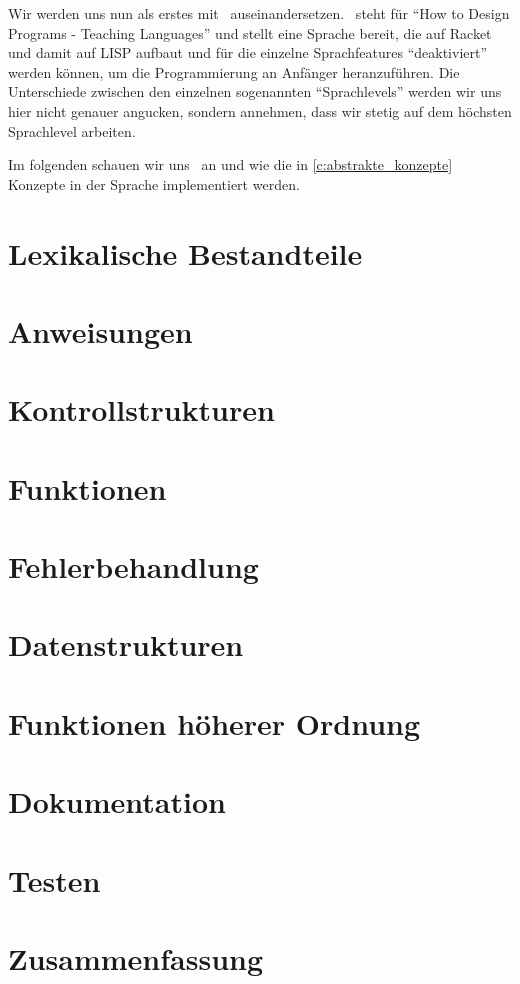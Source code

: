 Wir werden uns nun als erstes mit \racket\, auseinandersetzen. \racket\, steht für \enquote{How to Design Programs - Teaching Languages} und stellt eine Sprache bereit, die auf Racket und damit auf LISP aufbaut und für die einzelne Sprachfeatures \enquote{deaktiviert} werden können, um die Programmierung an Anfänger heranzuführen. Die Unterschiede zwischen den einzelnen sogenannten \enquote{Sprachlevels} werden wir uns hier nicht genauer angucken, sondern annehmen, dass wir stetig auf dem höchsten Sprachlevel arbeiten.

Im folgenden schauen wir uns \racket\, an und wie die in \ref{c:abstrakte_konzepte} Konzepte in der Sprache implementiert werden.

\section{Lexikalische Bestandteile}
	

\section{Anweisungen}
	

\section{Kontrollstrukturen}
	

\section{Funktionen}
	

\section{Fehlerbehandlung}
	

\section{Datenstrukturen}
	

\section{Funktionen höherer Ordnung}
	

\section{Dokumentation}
	

\section{Testen}
	

\section{Zusammenfassung}
	
